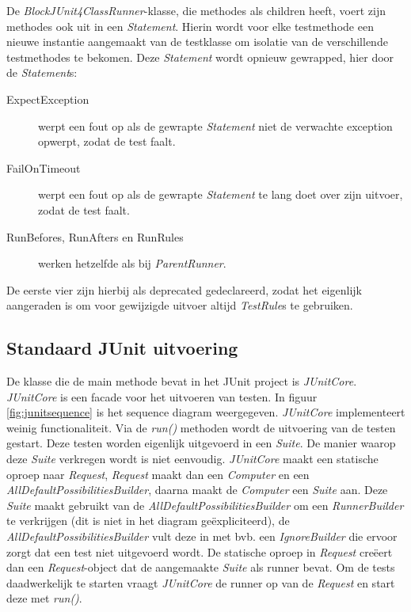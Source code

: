 \documentclass[i1]{oss}
\begin{document}
De \emph{BlockJUnit4ClassRunner}-klasse, die methodes als children heeft, voert zijn methodes ook uit in een \emph{Statement}. Hierin wordt voor elke testmethode een nieuwe instantie aangemaakt van de testklasse om isolatie van de verschillende testmethodes te bekomen. Deze \emph{Statement} wordt opnieuw gewrapped, hier door de \emph{Statement}s:

\begin{description}
\item[ExpectException] werpt een fout op als de gewrapte \emph{Statement} niet de verwachte exception opwerpt, zodat de test faalt.
\item[FailOnTimeout] werpt een fout op als de gewrapte \emph{Statement} te lang doet over zijn uitvoer, zodat de test faalt.
\item[RunBefores, RunAfters en RunRules] werken hetzelfde als bij \emph{ParentRunner}.
\end{description}

De eerste vier zijn hierbij als deprecated gedeclareerd, zodat het eigenlijk aangeraden is om voor gewijzigde uitvoer altijd \emph{TestRule}s te gebruiken.


\subsection{Standaard JUnit uitvoering}

De klasse die de main methode bevat in het JUnit project is \emph{JUnitCore}. \emph{JUnitCore} is een facade voor het uitvoeren van testen. In figuur \ref{fig:junitsequence} is het sequence diagram weergegeven. \emph{JUnitCore} implementeert weinig functionaliteit. Via de \emph{run()} methoden wordt de uitvoering van de testen gestart. Deze testen worden eigenlijk uitgevoerd in een \emph{Suite}. De manier waarop deze \emph{Suite} verkregen wordt is niet eenvoudig. \emph{JUnitCore} maakt een statische oproep naar \emph{Request}, \emph{Request} maakt dan een \emph{Computer} en een \emph{AllDefaultPossibilitiesBuilder}, daarna maakt de \emph{Computer} een \emph{Suite} aan. Deze \emph{Suite} maakt gebruikt van de \emph{AllDefaultPossibilitiesBuilder} om een \emph{RunnerBuilder} te verkrijgen (dit is niet in het diagram ge\"expliciteerd), de \emph{AllDefaultPossibilitiesBuilder} vult deze in met bvb. een \emph{IgnoreBuilder} die ervoor zorgt dat een test niet uitgevoerd wordt. De statische oproep in \emph{Request} cre\"eert dan een \emph{Request}-object dat de aangemaakte \emph{Suite} als runner bevat. Om de tests daadwerkelijk te starten vraagt \emph{JUnitCore} de runner op van de \emph{Request} en start deze met \emph{run()}.
\end{document}
